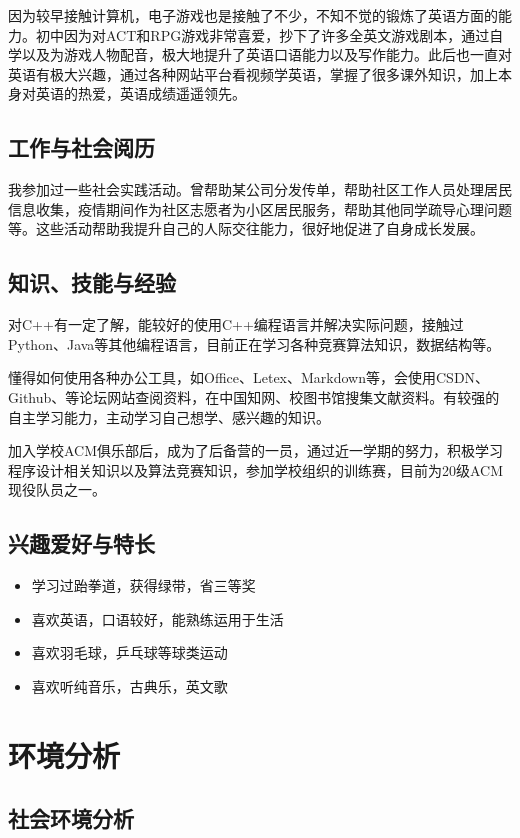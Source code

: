 \documentclass{article}
\begin{document}
因为较早接触计算机，电子游戏也是接触了不少，不知不觉的锻炼了英语方面的能力。初中因为对ACT和RPG游戏非常喜爱，抄下了许多全英文游戏剧本，通过自学以及为游戏人物配音，极大地提升了英语口语能力以及写作能力。此后也一直对英语有极大兴趣，通过各种网站平台看视频学英语，掌握了很多课外知识，加上本身对英语的热爱，英语成绩遥遥领先。

\subsection{工作与社会阅历}

我参加过一些社会实践活动。曾帮助某公司分发传单，帮助社区工作人员处理居民信息收集，疫情期间作为社区志愿者为小区居民服务，帮助其他同学疏导心理问题等。这些活动帮助我提升自己的人际交往能力，很好地促进了自身成长发展。

\subsection{知识、技能与经验}

对C++有一定了解，能较好的使用C++编程语言并解决实际问题，接触过Python、Java等其他编程语言，目前正在学习各种竞赛算法知识，数据结构等。

懂得如何使用各种办公工具，如Office、Letex、Markdown等，会使用CSDN、Github、等论坛网站查阅资料，在中国知网、校图书馆搜集文献资料。有较强的自主学习能力，主动学习自己想学、感兴趣的知识。

加入学校ACM俱乐部后，成为了后备营的一员，通过近一学期的努力，积极学习程序设计相关知识以及算法竞赛知识，参加学校组织的训练赛，目前为20级ACM现役队员之一。


\subsection{兴趣爱好与特长}

\begin{itemize}
    \item 学习过跆拳道，获得绿带，省三等奖
    \item 喜欢英语，口语较好，能熟练运用于生活
    \item 喜欢羽毛球，乒乓球等球类运动
    \item 喜欢听纯音乐，古典乐，英文歌
\end{itemize}

\section{环境分析}

\subsection{社会环境分析}
\end{document}
